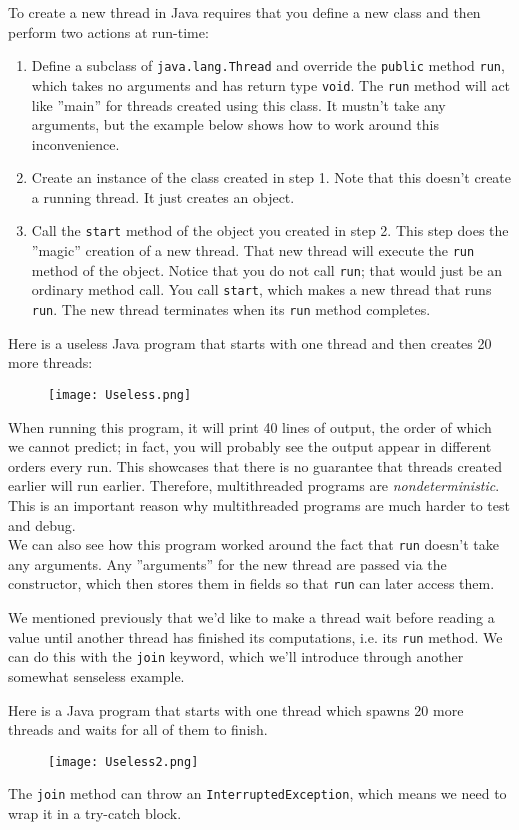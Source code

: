 \documentclass[main]{subfiles}
\begin{document}
To create a new thread in Java requires that you define a new class and then perform two actions at run-time:
\begin{enumerate}
    \item Define a subclass of \texttt{java.lang.Thread} and override the \texttt{public} method \texttt{run}, which takes no arguments and has return type \texttt{void}. The \texttt{run} method will act like ''main'' for threads created using this class. It mustn't take any arguments, but the example below shows how to work around this inconvenience.
    \item Create an instance of the class created in step 1. Note that this doesn't create a running thread. It just creates an object.
    \item Call the \texttt{start} method of the object you created in step 2. This step does the ''magic'' creation of a new thread. That new thread will execute the \texttt{run} method of the object. Notice that you do not call \texttt{run}; that would just be an ordinary method call. You call \texttt{start}, which makes a new thread that runs \texttt{run}. The new thread terminates when its \texttt{run} method completes.
\end{enumerate}
\begin{example}
    Here is a useless Java program that starts with one thread and then creates 20 more threads:
    \begin{figure}[H]
        \centering
        \texttt{[image: Useless.png]}
    \end{figure}
    When running this program, it will print 40 lines of output, the order of which we cannot predict; in fact, you will probably see the output appear in different orders every run. This showcases that there is no guarantee that threads created earlier will run earlier. Therefore, multithreaded programs are \textit{nondeterministic}. This is an important reason why multithreaded programs are much harder to test and debug.\\[3mm]
    We can also see how this program worked around the fact that \texttt{run} doesn't take any arguments. Any ''arguments'' for the new thread are passed via the constructor, which then stores them in fields so that \texttt{run} can later access them.
\end{example}
We mentioned previously that we'd like to make a thread wait before reading a value until another thread has finished its computations, i.e. its \texttt{run} method. We can do this with the \texttt{join} keyword, which we'll introduce through another somewhat senseless example.
\begin{example}
    Here is a Java program that starts with one thread which spawns 20 more threads and waits for all of them to finish.
    \begin{figure}[H]
        \centering
        \texttt{[image: Useless2.png]}
    \end{figure}
    The \texttt{join} method can throw an \texttt{InterruptedException}, which means we need to wrap it in a try-catch block.
\end{example}
\end{document}
